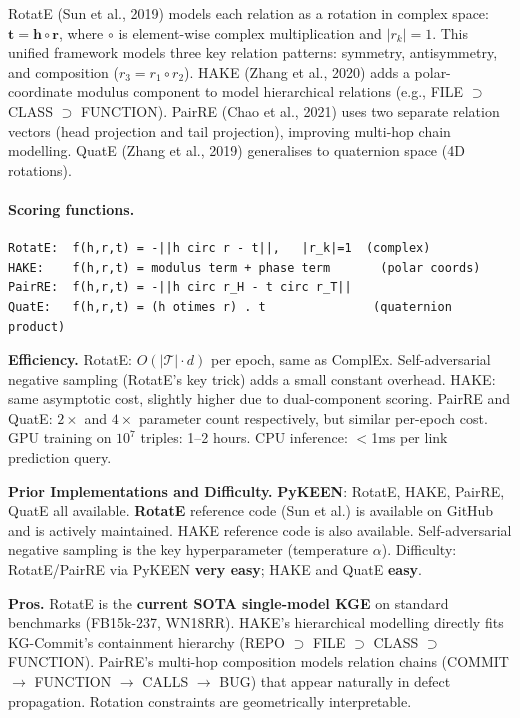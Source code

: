 \documentclass[12pt,a4paper]{article}
\begin{document}
RotatE (Sun et al., 2019) models each relation as a rotation in complex space:
$\mathbf{t} = \mathbf{h} \circ \mathbf{r}$, where $\circ$ is element-wise
complex multiplication and $|r_k| = 1$. This unified framework models three
key relation patterns: symmetry, antisymmetry, and composition ($r_3 = r_1
\circ r_2$). HAKE (Zhang et al., 2020) adds a polar-coordinate modulus
component to model hierarchical relations (e.g., FILE $\supset$ CLASS $\supset$
FUNCTION). PairRE (Chao et al., 2021) uses two separate relation vectors
(head projection and tail projection), improving multi-hop chain modelling.
QuatE (Zhang et al., 2019) generalises to quaternion space (4D rotations).

\paragraph{Scoring functions.}
\begin{lstlisting}
RotatE:  f(h,r,t) = -||h circ r - t||,   |r_k|=1  (complex)
HAKE:    f(h,r,t) = modulus term + phase term       (polar coords)
PairRE:  f(h,r,t) = -||h circ r_H - t circ r_T||
QuatE:   f(h,r,t) = (h otimes r) . t               (quaternion product)
\end{lstlisting}

\begin{effbox}
\textbf{Efficiency.}
RotatE: $O(|\mathcal{T}| \cdot d)$ per epoch, same as ComplEx. Self-adversarial
negative sampling (RotatE's key trick) adds a small constant overhead.
HAKE: same asymptotic cost, slightly higher due to dual-component scoring.
PairRE and QuatE: $2\times$ and $4\times$ parameter count respectively, but
similar per-epoch cost. GPU training on $10^7$ triples: 1--2 hours.
CPU inference: $<$1ms per link prediction query.
\end{effbox}

\begin{implbox}
\textbf{Prior Implementations and Difficulty.}
\textbf{PyKEEN}: RotatE, HAKE, PairRE, QuatE all available.
\textbf{RotatE} reference code (Sun et al.) is available on GitHub and is
actively maintained. HAKE reference code is also available. Self-adversarial
negative sampling is the key hyperparameter (temperature $\alpha$).
Difficulty: RotatE/PairRE via PyKEEN \textbf{very easy}; HAKE and QuatE
\textbf{easy}.
\end{implbox}

\begin{prosbox}
\textbf{Pros.}
RotatE is the \textbf{current SOTA single-model KGE} on standard benchmarks
(FB15k-237, WN18RR). HAKE's hierarchical modelling directly fits KG-Commit's
containment hierarchy (REPO $\supset$ FILE $\supset$ CLASS $\supset$ FUNCTION).
PairRE's multi-hop composition models relation chains (COMMIT $\to$ FUNCTION
$\to$ CALLS $\to$ BUG) that appear naturally in defect propagation. Rotation
constraints are geometrically interpretable.
\end{prosbox}
\end{document}
